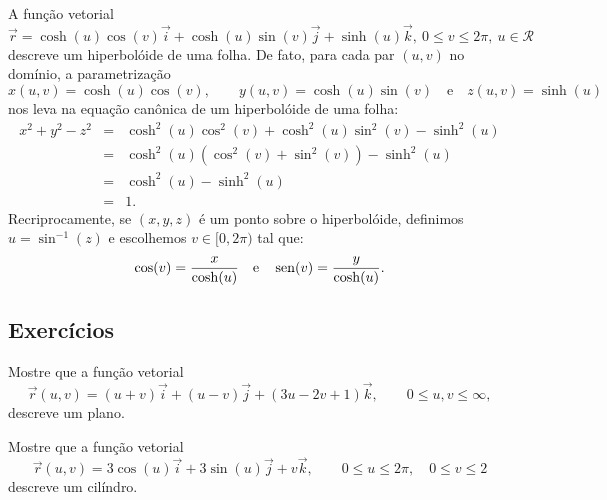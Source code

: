 \begin{ex}A função vetorial
 $$
 \vec{r}=\cosh(u)\cos( v)\vec{i}+ \cosh(u)\sin(v)\vec{j}+\sinh(u)\vec{k},\ 0\leq v\leq 2\pi,\ u\in\mathcal{R}
 $$
 descreve um hiperbolóide de uma folha. De fato, para cada par $(u,v)$ no domínio, a parametrização
 $$
 x(u,v)=\cosh(u)\cos(v),\qquad y(u,v)=\cosh(u)\sin(v)\quad\text{e}\quad z(u,v)=\sinh(u)
 $$
 nos leva na equação canônica de um hiperbolóide de uma folha:
 \begin{eqnarray*}
 x^2+y^2-z^2&=&\cosh^2(u)\cos^2(v)+\cosh^2(u)\sin^2(v)-\sinh^2(u)  \\
 &=&\cosh^2(u)(\cos^2(v)+\sin^2(v))-\sinh^2(u)  \\
 &=&\cosh^2(u)-\sinh^2(u)  \\
 &=&1.
 \end{eqnarray*}
Recriprocamente, se $(x,y,z)$ é um ponto sobre o hiperbolóide, definimos $u=\sin^{-1}(z)$ e escolhemos $v\in[0,2\pi)$ tal que:
$$\cos(v)=\frac{x}{\cosh(u)} \quad \hbox{e} \quad \sin(v)=\frac{y}{\cosh(u)}.$$
 \end{ex}
 
 \subsection*{Exercícios}
 \begin{exer}Mostre que a função vetorial
  $$
  \vec{r}(u,v)=(u+v)\vec{i}+(u-v)\vec{j}+(3u-2v+1)\vec{k}, \qquad 0\leq u,v\leq \infty,
  $$
  descreve um plano.
 \end{exer}

 \begin{exer}Mostre que a função vetorial
  $$
  \vec{r}(u,v)=3\cos(u)\vec{i}+3\sin(u)\vec{j} +v\vec{k}, \qquad 0\leq u\leq 2\pi,\quad 0\leq v\leq 2
  $$
  descreve um cilíndro.
 \end{exer}
 
 
